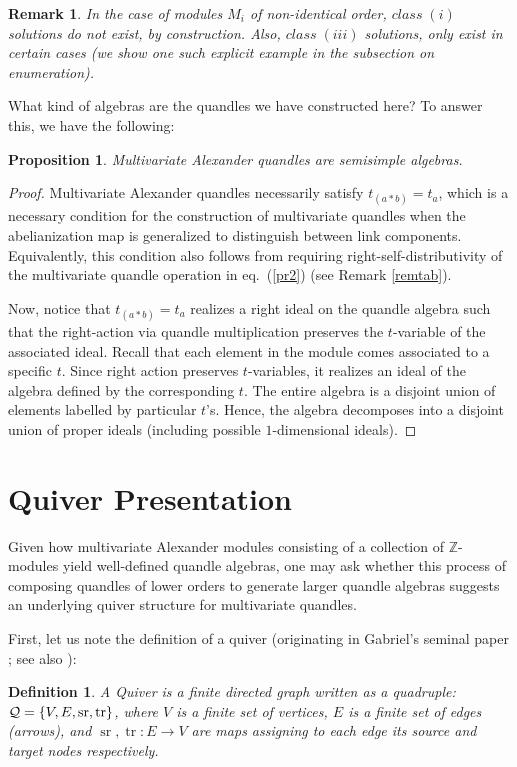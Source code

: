 \documentclass[a4paper,12pt]{article}
\newtheorem{proposition}{Proposition}[section]
\newtheorem{definition}{Definition}[section]
\newtheorem{remark}{Remark}[section]
\newcommand{\Z}{\mathbb{Z}}
\begin{document}
\begin{remark}
In the case of modules $M_i$ of non-identical order, $class \; (i)$ solutions do not exist, by construction. Also, $class \; (iii)$ solutions, only exist in certain cases (we show one such explicit example in the subsection on enumeration).
\end{remark}


What kind of algebras are the quandles we have constructed here? To answer this, we have the following: 
\begin{proposition}
Multivariate Alexander quandles are semisimple algebras.  
\label{prop5.2v0}
\end{proposition}

\begin{proof}  
Multivariate Alexander quandles necessarily satisfy $t_{(a * b)} = t_a$, which is a necessary condition for the construction of multivariate quandles when the abelianization map is generalized to distinguish between link components. Equivalently, this condition also follows from requiring right-self-distributivity of the multivariate quandle operation in eq.~(\ref{pr2}) (see Remark \ref{remtab}).  

Now, notice that $t_{(a * b)} = t_a$ realizes a right ideal on the quandle algebra such that the right-action via quandle multiplication preserves the $t$-variable of the associated ideal. Recall that each element in the module comes associated to a specific $t$. Since right action preserves $t$-variables, it realizes an ideal of the algebra defined by the corresponding $t$. The entire algebra is a disjoint union of elements labelled by particular $t$'s. Hence, the algebra decomposes into a disjoint union of proper ideals (including possible $1$-dimensional ideals).
\end{proof}




\section{Quiver Presentation }

Given how multivariate Alexander modules consisting of a collection of $\Z$-modules yield well-defined quandle algebras, one may ask whether this process of composing quandles of lower orders to generate larger quandle algebras suggests an underlying quiver structure for multivariate quandles.   

First, let us note the definition of a quiver (originating in Gabriel's seminal paper  \cite{gabriel1972unzerlegbare}; see also \cite{crawley1992lectures}):
\begin{definition}
A \emph{Quiver} is a finite directed graph written as a quadruple: ${\cal Q} = \{ V, E, \operatorname{sr}, \operatorname{tr} \}$, where $V$ is a finite set of vertices, $E$ is a finite set of edges (arrows), and $\operatorname{sr}, \operatorname{tr} : E \to V$ are maps assigning to each edge its source and target nodes respectively.  
\end{definition}
\end{document}

